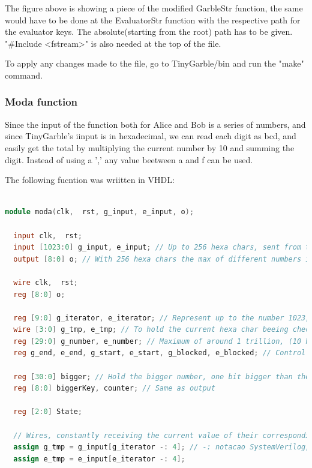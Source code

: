 \begin{refsection}
The figure above is showing a piece of the modified GarbleStr function, the same would have to be done at the EvaluatorStr function with the respective path for the evaluator keys. The absolute(starting from the root) path has to be given. "\#Include <fstream>" is also needed at the top of the file.

To apply any changes made to the file, go to TinyGarble/bin and run the "make" command.

\subsubsection{Moda function}

Since the input of the function both for Alice and Bob is a series of numbers, and since TinyGarble's iinput is in hexadecimal, we can read each digit as bcd, and easily get the total by multiplying the current number by 10 and summing the digit. Instead of using a ',' any value beetween a and f can be used.

The following fucntion was wriitten in VHDL:

\begin{lstlisting}[caption={moda.vhd}, language=Verilog, captionpos=b] 

module moda(clk,  rst, g_input, e_input, o);

  input clk,  rst;
  input [1023:0] g_input, e_input; // Up to 256 hexa chars, sent from the testbench
  output [8:0] o; // With 256 hexa chars the max of different numbers is 512 (256 / 2 (commas) * 4)

  wire clk,  rst;
  reg [8:0] o;

  reg [9:0] g_iterator, e_iterator; // Represent up to the number 1023, to iterate the inputs
  wire [3:0] g_tmp, e_tmp; // To hold the current hexa char beeing checked
  reg [29:0] g_number, e_number; // Maximum of around 1 trillion, (10 hexa digits, because in bcd)
  reg g_end, e_end, g_start, e_start, g_blocked, e_blocked; // Control registers

  reg [30:0] bigger; // Hold the bigger number, one bit bigger than the biggest number for the inputs
  reg [8:0] biggerKey, counter; // Same as output

  reg [2:0] State; 

  // Wires, constantly receiving the current value of their corresponding input with the current interator
  assign g_tmp = g_input[g_iterator -: 4]; // -: notacao SystemVerilog, ver se funcioa com yosys 
  assign e_tmp = e_input[e_iterator -: 4];



\end{lstlisting}
\end{refsection}
